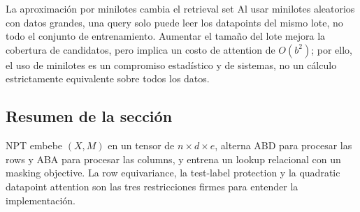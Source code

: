 \begin{warningbox}{La aproximación por minilotes cambia el retrieval set}
Al usar minilotes aleatorios con datos grandes, una query solo puede leer los datapoints del mismo lote, no todo el conjunto de entrenamiento. Aumentar el tamaño del lote mejora la cobertura de candidatos, pero implica un costo de attention de $O(b^2)$; por ello, el uso de minilotes es un compromiso estadístico y de sistemas, no un cálculo estrictamente equivalente sobre todos los datos.
\end{warningbox}


\subsection{Resumen de la sección}

NPT embebe $(X,M)$ en un tensor de $n\times d\times e$, alterna ABD para procesar las rows y ABA para procesar las columns, y entrena un lookup relacional con un masking objective. La row equivariance, la test-label protection y la quadratic datapoint attention son las tres restricciones firmes para entender la implementación.
